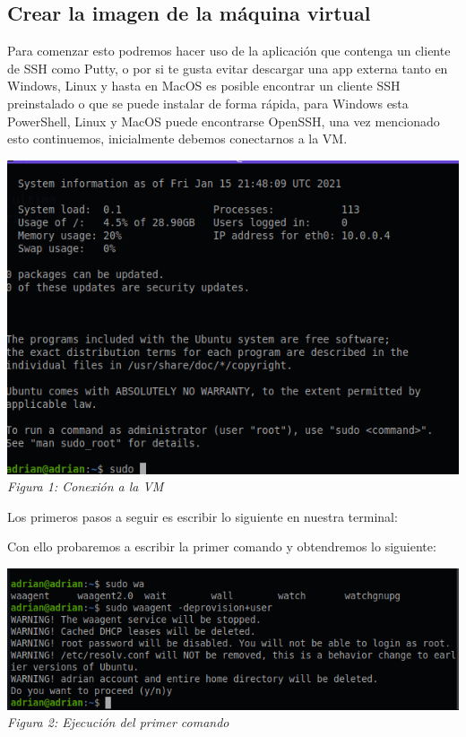 \documentclass[10pt,executivepaper]{article}
\begin{document}
\subsection{Crear la imagen de la máquina virtual}
Para comenzar esto podremos hacer uso de la aplicación que contenga un cliente de SSH como Putty, o por si te gusta evitar descargar una app externa tanto en Windows, Linux y hasta en MacOS es posible encontrar un cliente SSH preinstalado o que se puede instalar de forma rápida, para Windows esta PowerShell, Linux y MacOS puede encontrarse OpenSSH, una vez mencionado esto continuemos, inicialmente debemos conectarnos a la VM.\\
\begin{center}
  \includegraphics[scale=0.5]{imgs/1.png}\\
  \textit{Figura 1: Conexión a la VM}
\end{center}
Los primeros pasos a seguir es escribir lo siguiente en nuestra terminal:

\clearpage
Con ello probaremos a escribir la primer comando y obtendremos lo siguiente:
\begin{center}
  \includegraphics[scale=0.5]{imgs/2.png}\\
  \textit{Figura 2: Ejecución del primer comando}
\end{center}
\end{document}
